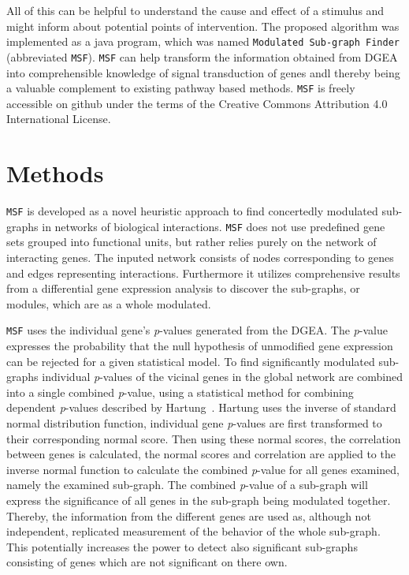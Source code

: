 \documentclass[10pt,a4paper,twocolumn]{article}
\begin{document}
All of this can be helpful to understand the cause and effect of a
stimulus and might inform about potential points of intervention. The
proposed algorithm was implemented as a java program, which was named
\texttt{Modulated Sub-graph Finder} (abbreviated
\texttt{MSF}). \texttt{MSF} can help transform the information
obtained from DGEA into comprehensible knowledge of signal
transduction of genes andl thereby being a valuable complement to
existing pathway based methods. \texttt{MSF} is freely accessible on
github under the terms of the Creative Commons Attribution 4.0
International License.

\section*{Methods}
\texttt{MSF} is developed as a novel heuristic approach to find
concertedly modulated sub-graphs in networks of biological
interactions.  \texttt{MSF} does not use predefined gene sets grouped
into functional units, but rather relies purely on the network of
interacting genes.  The inputed network consists of nodes
corresponding to genes and edges representing
interactions. Furthermore it utilizes comprehensive results from a
differential gene expression analysis to discover the sub-graphs, or
modules, which are as a whole modulated.

\texttt{MSF} uses the individual gene's \textit{p}-values generated
from the DGEA. The \textit{p}-value expresses the probability that the
null hypothesis of unmodified gene expression can be rejected for a
given statistical model. To find significantly modulated sub-graphs
individual \textit{p}-values of the vicinal genes in the global
network are combined into a single combined \textit{p}-value, using a
statistical method for combining dependent \textit{p}-values described
by Hartung~\cite{Hartung}. Hartung uses the inverse of standard normal
distribution function, individual gene \textit{p}-values are first
transformed to their corresponding normal score. Then using these
normal scores, the correlation between genes is calculated, the normal
scores and correlation are applied to the inverse normal function to
calculate the combined \textit{p}-value for all genes examined, namely
the examined sub-graph. The combined \textit{p}-value of a sub-graph
will express the significance of all genes in the sub-graph being
modulated together. Thereby, the information from the different genes
are used as, although not independent, replicated measurement of the
behavior of the whole sub-graph. This potentially increases the power
to detect also significant sub-graphs consisting of genes which are
not significant on there own.
\newline
\end{document}
